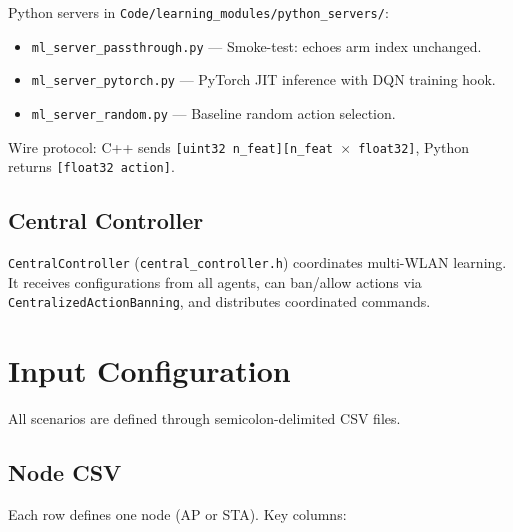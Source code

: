 \documentclass[11pt,a4paper]{article}
\begin{document}
Python servers in \texttt{Code/learning\_modules/python\_servers/}:
\begin{itemize}[nosep]
  \item \texttt{ml\_server\_passthrough.py} --- Smoke-test: echoes arm index unchanged.
  \item \texttt{ml\_server\_pytorch.py} --- PyTorch JIT inference with DQN training hook.
  \item \texttt{ml\_server\_random.py} --- Baseline random action selection.
\end{itemize}

Wire protocol: C++ sends \texttt{[uint32 n\_feat][n\_feat $\times$ float32]}, Python returns \texttt{[float32 action]}.

\subsection{Central Controller}

\texttt{CentralController} (\texttt{central\_controller.h}) coordinates multi-WLAN learning.  It receives configurations from all agents, can ban/allow actions via \texttt{CentralizedActionBanning}, and distributes coordinated commands.

\section{Input Configuration}
\label{sec:input}

All scenarios are defined through semicolon-delimited CSV files.

\subsection{Node CSV}

Each row defines one node (AP or STA).  Key columns:
\end{document}
